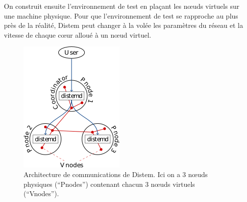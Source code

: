 On construit ensuite l'environnement de test en plaçant les n\oe uds virtuels
sur une machine physique. Pour que l'environnement de test se rapproche au plus
près de la réalité, Distem peut changer à la volée les paramètres du réseau et
la vitesse de chaque c\oe ur alloué à un n\oe ud virtuel.

\begin{figure}
  \centering
  \includegraphics{Pictures/png/Distem_architecture}
  \caption[Architecture de communications de Distem]{Architecture de communications de Distem. Ici on a 3 n\oe uds physiques (``Pnodes'') contenant chacun 3 n\oe uds virtuels (``Vnodes'').}
  \label{Distem_archi}
\end{figure}

